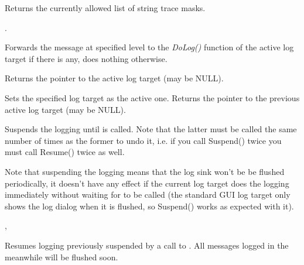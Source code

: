 Returns the currently allowed list of string trace masks.

.

\label{wxlogonlog}


Forwards the message at specified level to the {\it DoLog()} function of the
active log target if there is any, does nothing otherwise.

\label{wxloggetactivetarget}


Returns the pointer to the active log target (may be NULL).

\label{wxlogsetactivetarget}


Sets the specified log target as the active one. Returns the pointer to the
previous active log target (may be NULL).

\label{wxlogsuspend}


Suspends the logging until  is called. Note that
the latter must be called the same number of times as the former to undo it,
i.e. if you call Suspend() twice you must call Resume() twice as well.

Note that suspending the logging means that the log sink won't be be flushed
periodically, it doesn't have any effect if the current log target does the
logging immediately without waiting for  to be
called (the standard GUI log target only shows the log dialog when it is
flushed, so Suspend() works as expected with it).


,\\

\label{wxlogresume}


Resumes logging previously suspended by a call to 
. All messages logged in the meanwhile will be
flushed soon.

